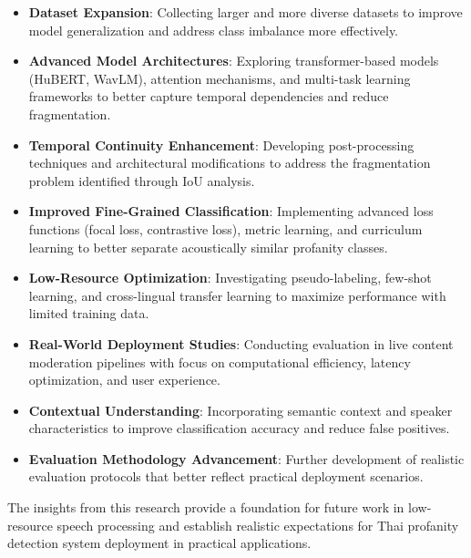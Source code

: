 \documentclass[11pt]{article}
\begin{document}
\begin{itemize}
    \item \textbf{Dataset Expansion}: Collecting larger and more diverse datasets to improve model generalization and address class imbalance more effectively.
    
    \item \textbf{Advanced Model Architectures}: Exploring transformer-based models (HuBERT, WavLM), attention mechanisms, and multi-task learning frameworks to better capture temporal dependencies and reduce fragmentation.
    
    \item \textbf{Temporal Continuity Enhancement}: Developing post-processing techniques and architectural modifications to address the fragmentation problem identified through IoU analysis.
    
    \item \textbf{Improved Fine-Grained Classification}: Implementing advanced loss functions (focal loss, contrastive loss), metric learning, and curriculum learning to better separate acoustically similar profanity classes.
    
    \item \textbf{Low-Resource Optimization}: Investigating pseudo-labeling, few-shot learning, and cross-lingual transfer learning to maximize performance with limited training data.
    
    \item \textbf{Real-World Deployment Studies}: Conducting evaluation in live content moderation pipelines with focus on computational efficiency, latency optimization, and user experience.
    
    \item \textbf{Contextual Understanding}: Incorporating semantic context and speaker characteristics to improve classification accuracy and reduce false positives.
    
    \item \textbf{Evaluation Methodology Advancement}: Further development of realistic evaluation protocols that better reflect practical deployment scenarios.
\end{itemize}

The insights from this research provide a foundation for future work in low-resource speech processing and establish realistic expectations for Thai profanity detection system deployment in practical applications.



\end{document}
